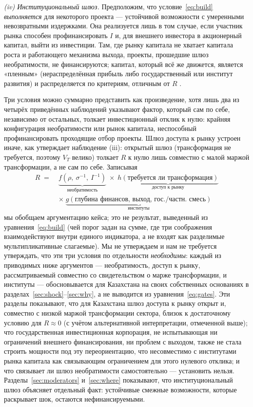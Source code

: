 \documentclass[12pt]{article}
\begin{document}
\emph{(iv) Институциональный шлюз.} Предположим, что условие~\eqref{eq:build}
\emph{выполняется} для некоторого проекта — устойчивой возможности с умеренными
невозвратными издержками. Она реализуется лишь в том случае, если участник рынка способен
профинансировать $I$ и, для внешнего инвестора в акционерный капитал, выйти из инвестиции.
Там, где рынку капитала не хватает капитала роста и работающего механизма выхода, проекты,
прошедшие шлюз необратимости, не финансируются; капитал, который всё же движется, является
«пленным» (нераспределённая прибыль либо государственный или институт развития) и
распределяется по критериям, отличным от $R$ \citep{khanna1997,khannapalepu2000,rajanzingales1998}.

Три условия можно суммарно представить как произведение, хотя лишь два из четырёх
приведённых наблюдений указывают фактор, который сам по себе, независимо от остальных,
толкает инвестиционный отклик к нулю: крайняя конфигурация необратимости или рынок
капитала, неспособный профинансировать проходящие отбор проекты. Шлюз доступа к рынку
устроен иначе, как утверждает наблюдение (iii): открытый шлюз (трансформация не требуется,
поэтому $V_T$ велико) толкает $R$ к нулю лишь совместно с малой маржой трансформации, а не
сам по себе. Записывая
\begin{equation}
\begin{aligned}
R \;=\;& \underbrace{f\!\left(\rho,\ \sigma^{-1},\ I^{-1}\right)}_{\text{необратимость}}
\;\times\; \underbrace{h(\text{требуется ли трансформация})}_{\text{доступ к рынку}} \\[2pt]
&\times\; \underbrace{g(\text{глубина финансов, выход, гос./частн. смесь})}_{\text{институты}}
\end{aligned}
\label{eq:gates}
\end{equation}
мы обобщаем аргументацию кейса; это не результат, выведенный из уравнения~\eqref{eq:build}
(чей порог задан на сумме, где три соображения взаимодействуют внутри единого индикатора,
а не входят как разделимые мультипликативные слагаемые). Мы не утверждаем и нам не требуется
утверждать, что эти три условия по отдельности \emph{необходимы}: каждый из приводимых ниже
аргументов — необратимость, доступ к рынку, рассматриваемый совместно со свидетельством о
марже трансформации, и институты — обосновывается для Казахстана на своих собственных
основаниях в разделах~\ref{sec:shock}--\ref{sec:why}, а не выводится из
уравнения~\eqref{eq:gates}. Эти разделы показывают, что для Казахстана шлюз доступа к рынку
открыт и, совместно с низкой маржой трансформации сектора, близок к достаточному условию
для $R \approx 0$ (с учётом альтернативной интерпретации, отмеченной выше); что
государственная инвестиционная корпорация, не испытывающая ни ограничений внешнего
финансирования, ни проблем с выходом, также не стала строить мощности под эту
переориентацию, что несовместимо с институтами рынка капитала как связывающим ограничением
для этого нулевого отклика; и что связывает ли шлюз необратимости самостоятельно —
установить нельзя. Разделы~\ref{sec:moderators} и~\ref{sec:where} показывают, что
институциональный шлюз объясняет отдельный факт: устойчивые смежные возможности, которые
раскрывает шок, остаются нефинансируемыми.
\end{document}
